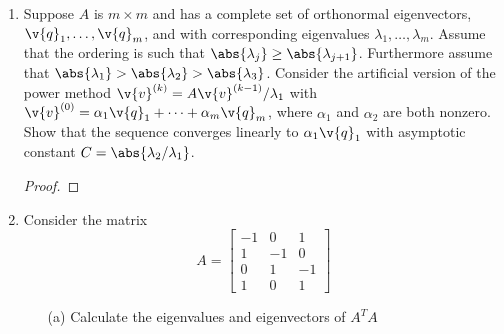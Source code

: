 \documentclass[11pt]{article}
\begin{document}
\begin{enumerate}
    \item %
        Suppose $A$ is $m \times m$ and has a complete set of orthonormal
        eigenvectors, $\v{q}_1, \ldots, \v{q}_m$, and with corresponding
        eigenvalues $\lambda_1, \ldots, \lambda_m$.
        Assume that the ordering is such that
        $\abs{\lambda_j} \ge \abs{\lambda_{j+1}}$.
        Furthermore assume that
        $\abs{\lambda_1} > \abs{\lambda_2} > \abs{\lambda_3}$.
        Consider the artificial version of the power method
        $\v{v}^{(k)} = A\v{v}^{(k-1)}/\lambda_1$ with
        $\v{v}^{(0)} = \alpha_1 \v{q}_1 + \cdots + \alpha_m \v{q}_m$, where
        $\alpha_1$ and $\alpha_2$ are both nonzero.
        Show that the sequence converges linearly to $\alpha_1 \v{q}_1$ with
        asymptotic constant $C = \abs{\lambda_2/\lambda_1}$.

        \begin{proof}
            
        \end{proof}

    \item %
        Consider the matrix
        \[
            A =
            \begin{bmatrix}
                -1 &  0 &  1 \\
                 1 & -1 &  0 \\
                 0 &  1 & -1 \\
                 1 &  0 &  1
            \end{bmatrix}
        \]
        \begin{enumerate}
            \item[(a)]
                Calculate the eigenvalues and eigenvectors of $A^T A$


\end{enumerate}
\end{enumerate}
\end{document}
